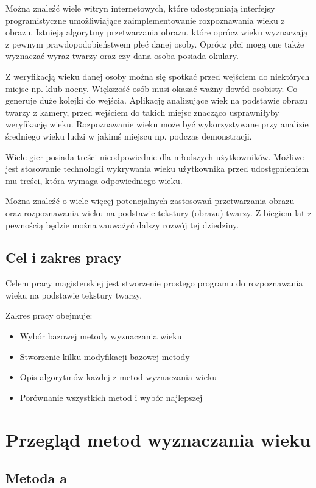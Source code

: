 \documentclass[a4paper,twoside,12pt]{book}
\begin{document}
Można znaleźć wiele witryn internetowych, które udostępniają interfejsy programistyczne umożliwiające zaimplementowanie rozpoznawania wieku z obrazu. Istnieją algorytmy przetwarzania obrazu, które oprócz wieku wyznaczają z pewnym prawdopodobieństwem płeć danej osoby. Oprócz płci mogą one także wyznaczać wyraz twarzy oraz czy dana osoba posiada okulary.

Z weryfikacją wieku danej osoby można się spotkać przed wejściem do niektórych miejsc np. klub nocny. Większość osób musi okazać ważny dowód osobisty. Co generuje duże kolejki do wejścia. Aplikację analizujące wiek na podstawie obrazu twarzy z kamery, przed wejściem do takich miejsc znacząco usprawniłyby weryfikację wieku.
Rozpoznawanie wieku może być wykorzystywane przy analizie średniego wieku ludzi w jakimś miejscu np. podczas demonstracji.

Wiele gier posiada treści nieodpowiednie dla młodszych użytkowników. Możliwe jest stosowanie technologii wykrywania wieku użytkownika przed udostępnieniem mu treści, która wymaga odpowiedniego wieku.
 
Można znaleźć o wiele więcęj potencjalnych zastosowań przetwarzania obrazu oraz rozpoznawania wieku na podstawie tekstury (obrazu) twarzy. Z biegiem lat z pewnością będzie można zauważyć dalszy rozwój tej dziedziny.

\section{Cel i zakres pracy}
Celem pracy magisterskiej jest stworzenie prostego programu do rozpoznawania wieku na podstawie tekstury twarzy.

Zakres pracy obejmuje:
\begin{itemize}
\item Wybór bazowej metody wyznaczania wieku
\item Stworzenie kilku modyfikacji bazowej metody
\item Opis algorytmów każdej z metod wyznaczania wieku
\item Porównanie wszystkich metod i wybór najlepszej
\end{itemize}

\chapter{Przegląd metod wyznaczania wieku}
\section{Metoda a}
\end{document}
